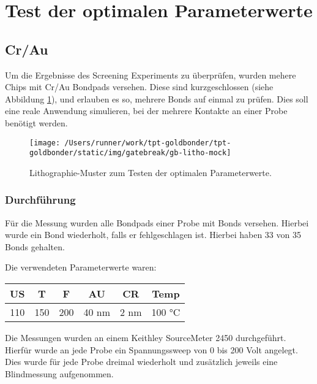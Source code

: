 \documentclass[
  paper=a4,
  ,captions=tableheading
]{scrartcl}
\begin{document}
\hypertarget{gb-mock}{%
\section{Test der optimalen Parameterwerte}\label{gb-mock}}

\hypertarget{crau}{%
\subsection{Cr/Au}\label{crau}}

Um die Ergebnisse des Screening Experiments zu überprüfen, wurden mehere Chips mit Cr/Au Bondpads versehen. Diese sind kurzgeschlossen (siehe Abbildung \ref{fig:mock-image}), und erlauben es so, mehrere Bonds auf einmal zu prüfen. Dies soll eine reale Anwendung simulieren, bei der mehrere Kontakte an einer Probe benötigt werden.

\begin{figure}

{\centering \texttt{[image: /Users/runner/work/tpt-goldbonder/tpt-goldbonder/static/img/gatebreak/gb-litho-mock]} 

}

\caption{Lithographie-Muster zum Testen der optimalen Parameterwerte.}\label{fig:mock-image}
\end{figure}

\hypertarget{durchfuxfchrung-1}{%
\subsubsection{Durchführung}\label{durchfuxfchrung-1}}

Für die Messung wurden alle Bondpads einer Probe mit Bonds versehen. Hierbei wurde ein Bond wiederholt, falls er fehlgeschlagen ist. Hierbei haben 33 von 35 Bonds gehalten.

Die verwendeten Parameterwerte waren:

\begin{tabular}{c|c|c|c|c|c}
\hline
US & T & F & AU & CR & Temp\\
\hline
110 & 150 & 200 & 40 nm & 2 nm & 100 °C\\
\hline
\end{tabular}

Die Messungen wurden an einem Keithley SourceMeter 2450 durchgeführt. Hierfür wurde an jede Probe ein Spannungssweep von 0 bis 200 Volt angelegt. Dies wurde für jede Probe dreimal wiederholt und zusätzlich jeweils eine Blindmessung aufgenommen.
\end{document}
